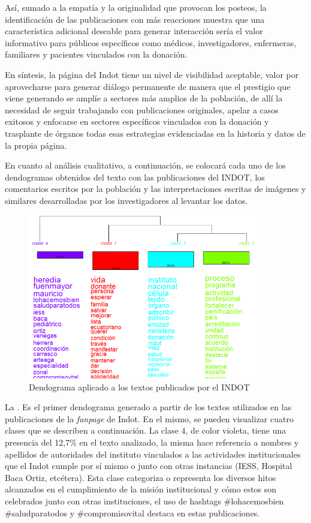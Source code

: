 \documentclass[spanish]{textolivre}
\begin{document}
Así, sumado a la empatía y la originalidad que provocan los posteos, la identificación de las publicaciones con más reacciones muestra que una característica adicional deseable para generar interacción sería el valor informativo para públicos específicos como médicos, investigadores, enfermeras, familiares y pacientes vinculados con la donación. 

En síntesis, la página del Indot tiene un nivel de visibilidad aceptable, valor por aprovecharse para generar diálogo permanente de manera que el prestigio que viene generando se amplíe a sectores más amplios de la población, de allí la necesidad de seguir trabajando con publicaciones originales, apelar a casos exitosos y enfocarse en sectores específicos vinculados con la donación y trasplante de órganos todas esas estrategias evidenciadas en la historia y datos de la propia página. 

En cuanto al análisis cualitativo, a continuación, se colocará cada uno de los dendogramas obtenidos del texto con las publicaciones del INDOT, los comentarios escritos por la población y las interpretaciones escritas de imágenes y similares desarrolladas por los investigadores al levantar los datos.

\begin{figure}[htbp]
 \centering
 \includegraphics[width=0.9\textwidth]{figure01.png}
 \caption{Dendograma aplicado a los textos publicados por el INDOT}
 \label{fig1}
\end{figure}

La . Es el primer dendograma generado a partir de los textos utilizados en las publicaciones de la \emph{fanpage} de Indot. En el mismo, se pueden visualizar cuatro clases que se describen a continuación. La clase 4, de color violeta, tiene una presencia del 12,7\% en el texto analizado, la misma hace referencia a nombres y apellidos de autoridades del instituto vinculados a las actividades institucionales que el Indot cumple por sí mismo o junto con otras instancias (IESS, Hospital Baca Ortiz, etcétera). Esta clase categoriza o representa los diversos hitos alcanzados en el cumplimiento de la misión institucional y cómo estos son celebrados junto con otras instituciones, el uso de hashtags \#lohacemosbien \#saludparatodos y \#compromisovital destaca en estas publicaciones. 
\end{document}
